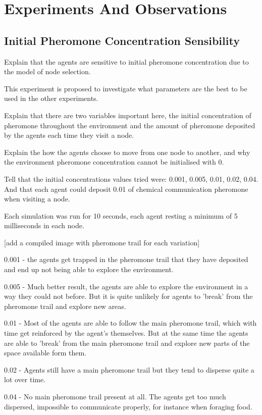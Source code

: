 \chapter{Experiments And Observations}
\label{ch:experiments-and-observations}

\section{Initial Pheromone Concentration Sensibility}
Explain that the agents are sensitive to initial pheromone concentration due to the model of node selection.

This experiment is proposed to investigate what parameters are the best to be used in the other experiments.

Explain that there are two variables important here, the initial concentration of pheromone throughout the environment and the amount of pheromone deposited by the agents each time they visit a node.

Explain the how the agents choose to move from one node to another, and why the environment pheromone concentration cannot be initialised with 0.

Tell that the initial concentrations values tried were: 0.001, 0.005, 0.01, 0.02, 0.04. And that each agent could deposit 0.01 of chemical communication pheromone when visiting a node.

Each simulation was run for 10 seconds, each agent resting a minimum of 5 milliseconds in each node.

[add a compiled image with pheromone trail for each variation]

0.001 - the agents get trapped in the pheromone trail that they have deposited and end up not being able to explore the environment.

0.005 - Much better result, the agents are able to explore the environment in a way they could not before. But it is quite unlikely for agents to 'break' from the pheromone trail and explore new areas.

0.01 - Most of the agents are able to follow the main pheromone trail, which with time get reinforced by the agent's themselves. But at the same time the agents are able to 'break' from the main pheromone trail and explore new parts of the space available form them.

0.02 - Agents still have a main pheromone trail but they tend to disperse quite a lot over time.

0.04 - No main pheromone trail present at all. The agents get too much dispersed, impossible to communicate properly, for instance when foraging food.

